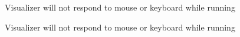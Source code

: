 
\begin{DoxyRefList}
\item[\label{bug__bug000001}%
\hypertarget{bug__bug000001}{}%
page \hyperlink{index}{Program 2 -\/ Hash Visualization} ]Visualizer will not respond to mouse or keyboard while running

Visualizer will not respond to mouse or keyboard while running
\end{DoxyRefList}